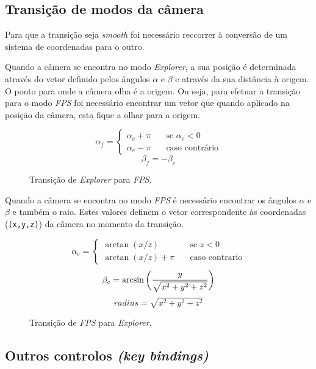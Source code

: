 \documentclass[a4paper]{article}
\begin{document}
\subsection{Transição de modos da câmera}

Para que a transição seja \textit{smooth} foi necessário reccorrer à conversão de um sistema de coordenadas para o outro.

Quando a câmera se encontra no modo \textit{Explorer}, a sua posição é determinada através do vetor definido pelos ângulos $\alpha$ e $\beta$ e através da sua distância à origem. O ponto para onde a câmera olha é a origem. Ou seja, para efetuar a transição para o modo \textit{FPS} foi necessário encontrar um vetor que quando aplicado na posição da câmera, esta fique a olhar para a origem.

\begin{figure}[H]
    \[
        \alpha_f =
        \begin{cases}
            \alpha_e + \pi & \quad \text{se } \alpha_e < 0\\
            \alpha_e - \pi & \quad \text{caso contrário}
        \end{cases}
    \]
    \[
        \beta_f = -\beta_e
    \]
    \caption{Transição de \textit{Explorer} para \textit{FPS}.}
\end{figure}

Quando a câmera se encontra no modo \textit{FPS} é necessário encontrar os ângulos $\alpha$ e $\beta$ e também o raio. Estes valores definem o vetor correspondente às coordenadas (\texttt{(x,y,z)}) da câmera no momento da transição.

\begin{figure}[H]
    \[
        \alpha_e =
        \begin{cases}
            \arctan(x / z)       & \quad \text{se } z < 0\\
            \arctan(x / z) + \pi & \quad \text{caso contrario}
        \end{cases}
    \]
    \[
        \beta_e = \arcsin\bigg(\frac{y}{\sqrt{x^2 + y^2 + z^2}}\bigg)\\
    \]
    \[
        radius = \sqrt{x^2 + y^2 + z^2}
    \]
    \caption{Transição de \textit{FPS} para \textit{Explorer}.}
\end{figure}

\subsection{Outros controlos \textit{(key bindings)}}
\end{document}
